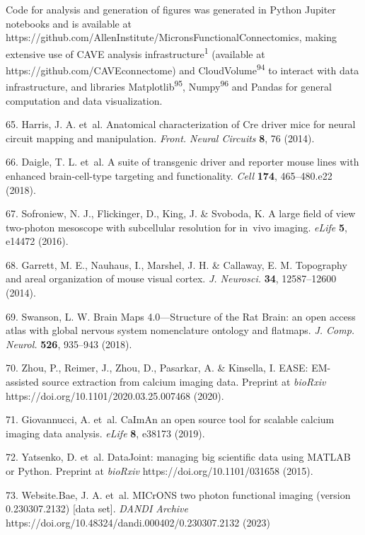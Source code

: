 \documentclass{article}
\begin{document}
Code for analysis and generation of figures was generated in Python Jupiter notebooks and is available at https://github.com/AllenInstitute/MicronsFunctionalConnectomics, making extensive use of CAVE analysis infrastructure\textsuperscript{1} (available at https://github.com/CAVEconnectome) and CloudVolume\textsuperscript{94} to interact with data infrastructure, and libraries Matplotlib\textsuperscript{95}, Numpy\textsuperscript{96} and Pandas for general computation and data visualization.

\begin{hangpars}\small

65. Harris, J. A. et~al. Anatomical characterization of Cre driver mice for neural circuit mapping and manipulation. \emph{Front. Neural Circuits} \textbf{8}, 76 (2014). 

66. Daigle, T. L. et~al. A suite of transgenic driver and reporter mouse lines with enhanced brain-cell-type targeting and functionality. \emph{Cell} \textbf{174}, 465–480.e22 (2018). 

67. Sofroniew, N. J., Flickinger, D., King, J. \& Svoboda, K. A large field of view two-photon mesoscope with subcellular resolution for in~vivo imaging. \emph{eLife} \textbf{5}, e14472 (2016). 

68. Garrett, M. E., Nauhaus, I., Marshel, J. H. \& Callaway, E. M. Topography and areal organization of mouse visual cortex. \emph{J. Neurosci.} \textbf{34}, 12587–12600 (2014). 

69. Swanson, L. W. Brain Maps 4.0—Structure of the Rat Brain: an open access atlas with global nervous system nomenclature ontology and flatmaps. \emph{J. Comp. Neurol.} \textbf{526}, 935–943 (2018). 

70. Zhou, P., Reimer, J., Zhou, D., Pasarkar, A. \& Kinsella, I. EASE: EM-assisted source extraction from calcium imaging data. Preprint at \emph{bioRxiv} https://doi.org/10.1101/2020.03.25.007468 (2020). 

71. Giovannucci, A. et~al. CaImAn an open source tool for scalable calcium imaging data analysis. \emph{eLife} \textbf{8}, e38173 (2019). 

72. Yatsenko, D. et~al. DataJoint: managing big scientific data using MATLAB or Python. Preprint at \emph{bioRxiv} https://doi.org/10.1101/031658 (2015). 

73. Website.Bae, J. A. et~al. MICrONS two photon functional imaging (version 0.230307.2132) [data set]. \emph{DANDI Archive} https://doi.org/10.48324/dandi.000402/0.230307.2132 (2023) 


\end{hangpars}
\end{document}
